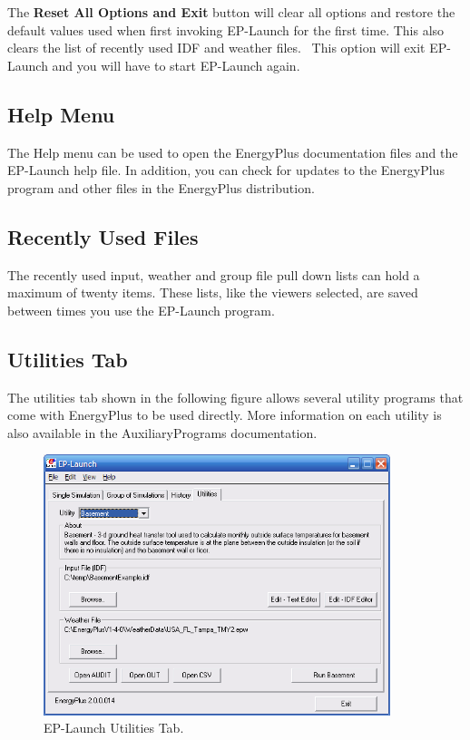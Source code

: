 The \textbf{Reset All Options and Exit} button will clear all options and restore the default values used when first invoking EP-Launch for the first time. This also clears the list of recently used IDF and weather files.~ This option will exit EP-Launch and you will have to start EP-Launch again.

\subsection{Help Menu}\label{help-menu}

The Help menu can be used to open the EnergyPlus documentation files and the EP-Launch help file. In addition, you can check for updates to the EnergyPlus program and other files in the EnergyPlus distribution.

\subsection{Recently Used Files}\label{recently-used-files}

The recently used input, weather and group file pull down lists can hold a maximum of twenty items. These lists, like the viewers selected, are saved between times you use the EP-Launch program.

\subsection{Utilities Tab}\label{utilities-tab}

The utilities tab shown in the following figure allows several utility programs that come with EnergyPlus to be used directly. More information on each utility is also available in the AuxiliaryPrograms documentation.

\begin{figure}[hbtp] %
\centering
\includegraphics[width=0.9\textwidth, height=0.9\textheight, keepaspectratio=true]{media/image009.png}
\caption{EP-Launch Utilities Tab. \protect \label{fig:ep-launch-utilities-tab.}}
\end{figure}

